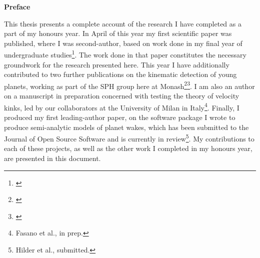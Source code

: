 {}

\begin{center}
    
    {\Large \textbf{Preface}}
    
\end{center}

\noindent This thesis presents a complete account of the research I have completed as a part of my honours year.
In April of this year my first scientific paper was published, where I was second-author, based on work done in my final year of undergraduate studies\footnote{\citealt{calcino2022}}.
The work done in that paper constitutes the necessary groundwork for the research presented here.
This year I have additionally contributed to two further publications on the kinematic detection of young planets, working as part of the SPH group here at Monash\footnote{\citealt{verrios2022}}\footnote{\citealt{garg2022}}.
I am also an author on a manuscript in preparation concerned with testing the theory of velocity kinks, led by our collaborators at the University of Milan in Italy\footnote{Fasano et al., in prep.}.
Finally, I produced my first leading-author paper, on the software package I wrote to produce semi-analytic models of planet wakes, which has been submitted to the Journal of Open Source Software and is currently in review\footnote{Hilder et al., submitted.}.
My contributions to each of these projects, as well as the other work I completed in my honours year, are presented in this document.








\newpage